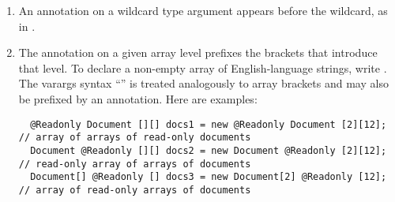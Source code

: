 \documentclass[10pt]{article}
\begin{document}
\begin{enumerate}


\item
  An annotation on a wildcard type argument appears before the wildcard,
  as in .


% 

\item
  The annotation on a given array level
  prefixes the brackets that introduce that level.  To declare
  a non-empty array of English-language strings, write .
  The varargs syntax ``'' is treated analogously to array brackets
  and may also be prefixed by an annotation.
%
  Here are examples:
\preverbnegspace
\begin{Verbatim}
  @Readonly Document [][] docs1 = new @Readonly Document [2][12]; // array of arrays of read-only documents
  Document @Readonly [][] docs2 = new Document @Readonly [2][12]; // read-only array of arrays of documents
  Document[] @Readonly [] docs3 = new Document[2] @Readonly [12]; // array of read-only arrays of documents
\end{Verbatim}


\end{enumerate}
\end{document}
